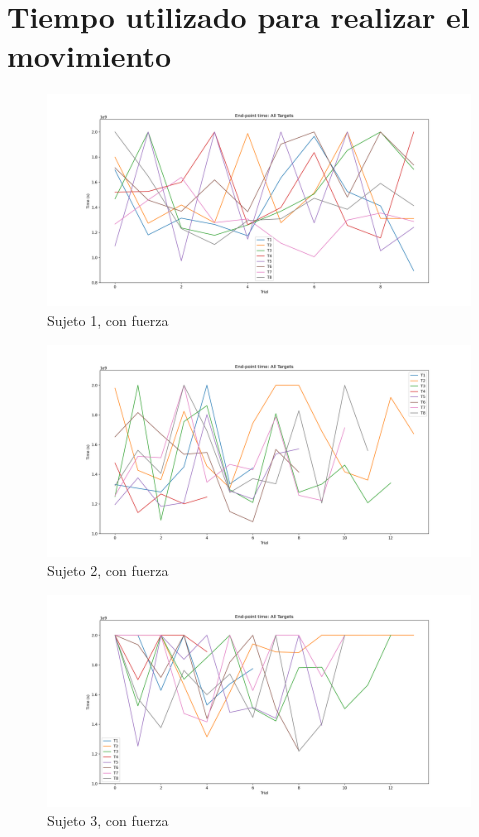 \documentclass[a4paper,11pt, oneside]{book}
\begin{document}
\section{Tiempo utilizado para realizar el movimiento}
\label{anexo:4}
\begin{figure}[H]
	\includegraphics[width=\linewidth]{sujeto1/force/evolution_time}
	\caption{Sujeto 1, con fuerza}
	\label{1-2-3}
\end{figure}
\begin{figure}[H]
	\includegraphics[width=\linewidth]{sujeto2/force/evolution_time}
	\caption{Sujeto 2, con fuerza}
	\label{2-2-3}
\end{figure}
\begin{figure}[H]
	\includegraphics[width=\linewidth]{sujeto3/force/evolution_time}
	\caption{Sujeto 3, con fuerza}
	\label{3-2-3}
\end{figure}
\end{document}
